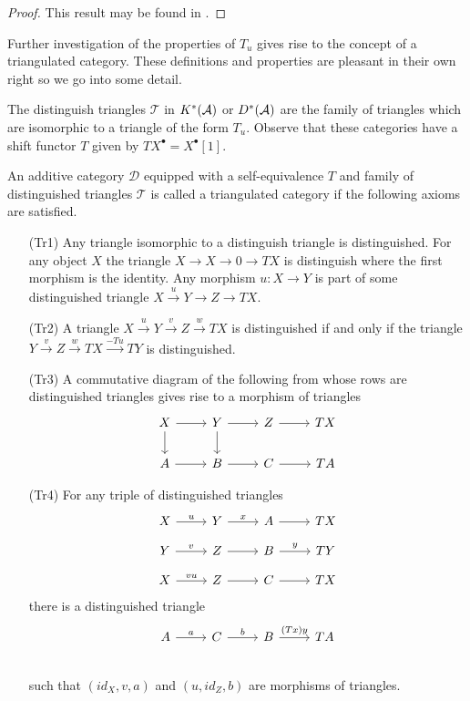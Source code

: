 \begin{proof}
  This result may be found in \cite[Chapter 1]{dimca2004sheaves}.
\end{proof}
Further investigation of the properties of $T_u$ gives rise to the concept of a triangulated category.
These definitions and properties are pleasant in their own right so we go into some detail.

The distinguish triangles $\mathcal{T}$ in $K^*(\AA)$ or $D^*(\AA)$ are the family of triangles which are isomorphic to a triangle of the form $T_u$.
Observe that these categories have a shift functor $T$ given by $TX^\bullet = X^\bullet[1]$.
\begin{definition}
 An additive category $\mathcal{D}$ equipped with a self-equivalence $T$ and family of distinguished triangles $\mathcal{T}$ is called a triangulated category if the following axioms are satisfied.
 \begin{enumerate}
   \item[(Tr1)] Any triangle isomorphic to a distinguish triangle is distinguished. For any object $X$ the triangle $X\to X \to 0 \to TX$ is distinguish where the first morphism is the identity.
   Any morphism $u:X\to Y$ is part of some distinguished triangle $X\xrightarrow{u} Y \to Z \to TX$.
   \item[(Tr2)] A triangle $X\xrightarrow{u} Y \xrightarrow{v} Z \xrightarrow{w} TX$ is distinguished if and only if the triangle $Y \xrightarrow{v} Z \xrightarrow{w} TX \xrightarrow{-Tu} TY$ is distinguished.
   \item[(Tr3)] A commutative diagram of the following from whose rows are distinguished triangles gives rise to a morphism of triangles
   $$
     \begin{tikzcd}
       X\arrow{d}\rar& Y\arrow{d}\rar & Z\rar & TX\\
       A\rar& B\rar & C\rar & TA
     \end{tikzcd}
    $$
   \item[(Tr4)] For any triple of distinguished triangles
   $$
     \begin{tikzcd}[row sep=small]
       X \arrow{r}{u} & Y \arrow{r}{x}& A \arrow{r}{} & TX \\
       Y \arrow{r}{v} & Z \arrow{r}{}& B \arrow{r}{y} & TY\\
       X \arrow{r}{vu} & Z\arrow{r}{} & C\arrow{r}{} & TX
     \end{tikzcd}
   $$
   there is a distinguished triangle
   $$\begin{tikzcd}
     A \arrow{r}{a} & C \arrow{r}{b}& B \arrow{r}{(Tx)y} & TA \\
   \end{tikzcd} $$
   such that $(id_X, v,a)$ and $(u,id_Z,b)$ are morphisms of triangles.
   \end{enumerate}
\end{definition}
